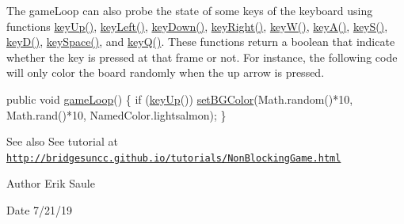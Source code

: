 The game\+Loop can also probe the state of some keys of the keyboard using functions \hyperlink{classbridges_1_1games_1_1_non_blocking_game_a524c340fabec1b7a69aa742e1347b7b4}{key\+Up()}, \hyperlink{classbridges_1_1games_1_1_non_blocking_game_ac8b9a6d6d4074105af6d28995091bd2b}{key\+Left()}, \hyperlink{classbridges_1_1games_1_1_non_blocking_game_ac59c5ac18a456cc1d69ec8d42a311840}{key\+Down()}, \hyperlink{classbridges_1_1games_1_1_non_blocking_game_a5a3db63942e995409daaf6b89f88b203}{key\+Right()}, \hyperlink{classbridges_1_1games_1_1_non_blocking_game_a45db18869044968a233a6f217650e34d}{key\+W()}, \hyperlink{classbridges_1_1games_1_1_non_blocking_game_a4328a21ca65c26e11161dfe362770917}{key\+A()}, \hyperlink{classbridges_1_1games_1_1_non_blocking_game_a4beb82246ef1eaf8c13aa406632ab936}{key\+S()}, \hyperlink{classbridges_1_1games_1_1_non_blocking_game_a830a2e8127b042f8915deb61f0038f2a}{key\+D()}, \hyperlink{classbridges_1_1games_1_1_non_blocking_game_a4ff32a8ba8aeb3f438751729f7380d16}{key\+Space()}, and \hyperlink{classbridges_1_1games_1_1_non_blocking_game_a4075b3185f2fe0d20c9ed9957c448aee}{key\+Q()}. These functions return a boolean that indicate whether the key is pressed at that frame or not. For instance, the following code will only color the board randomly when the up arrow is pressed.


\begin{DoxyCode}
\textcolor{keyword}{public} \textcolor{keywordtype}{void} \hyperlink{classbridges_1_1games_1_1_game_base_a56d05ed744791cfc1c3792f39ff438f1}{gameLoop}() \{
  \textcolor{keywordflow}{if} (\hyperlink{classbridges_1_1games_1_1_non_blocking_game_a524c340fabec1b7a69aa742e1347b7b4}{keyUp}())
    \hyperlink{classbridges_1_1games_1_1_game_base_a7b4d08cdb306a5bf7104ab5315acb414}{setBGColor}(Math.random()*10, Math.rand()*10, NamedColor.lightsalmon);
\}
\end{DoxyCode}


\begin{DoxySeeAlso}{See also}
See tutorial at \href{http://bridgesuncc.github.io/tutorials/NonBlockingGame.html}{\tt http\+://bridgesuncc.\+github.\+io/tutorials/\+Non\+Blocking\+Game.\+html}
\end{DoxySeeAlso}
\begin{DoxyAuthor}{Author}
Erik Saule 
\end{DoxyAuthor}
\begin{DoxyDate}{Date}
7/21/19 
\end{DoxyDate}
